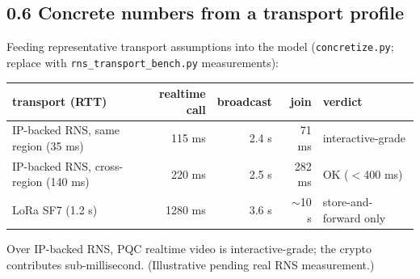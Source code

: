 \documentclass[10pt]{article}
\begin{document}
\subsection*{0.6 Concrete numbers from a transport profile}
Feeding representative transport assumptions into the model (\texttt{concretize.py};
replace with \texttt{rns\_transport\_bench.py} measurements):
\begin{center}\footnotesize
\begin{tabular}{|p{4.6cm}|r|r|r|l|}\hline
\textbf{transport (RTT)} & \textbf{realtime call} & \textbf{broadcast} & \textbf{join} & \textbf{verdict}\\\hline
IP-backed RNS, same region (35 ms) & 115 ms & 2.4 s & 71 ms & interactive-grade\\\hline
IP-backed RNS, cross-region (140 ms) & 220 ms & 2.5 s & 282 ms & OK ($<$400 ms)\\\hline
LoRa SF7 (1.2 s) & 1280 ms & 3.6 s & $\sim$10 s & store-and-forward only\\\hline
\end{tabular}
\end{center}
\noindent Over IP-backed RNS, PQC realtime video is interactive-grade; the crypto
contributes sub-millisecond. (Illustrative pending real RNS measurement.)
\end{document}
